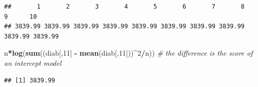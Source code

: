 \documentclass[
]{book}
\newenvironment{Shaded}{\begin{snugshade}}{\end{snugshade}}
\newcommand{\CommentTok}[1]{\textcolor[rgb]{0.56,0.35,0.01}{\textit{#1}}}
\newcommand{\DecValTok}[1]{\textcolor[rgb]{0.00,0.00,0.81}{#1}}
\newcommand{\KeywordTok}[1]{\textcolor[rgb]{0.13,0.29,0.53}{\textbf{#1}}}
\newcommand{\NormalTok}[1]{#1}
\newcommand{\OperatorTok}[1]{\textcolor[rgb]{0.81,0.36,0.00}{\textbf{#1}}}
\newcommand{\StringTok}[1]{\textcolor[rgb]{0.31,0.60,0.02}{#1}}
\begin{document}
\begin{Shaded}
\end{Shaded}

\begin{verbatim}
##       1       2       3       4       5       6       7       8       9      10 
## 3839.99 3839.99 3839.99 3839.99 3839.99 3839.99 3839.99 3839.99 3839.99 3839.99
\end{verbatim}

\begin{Shaded}
\begin{Highlighting}[]
\NormalTok{    n}\OperatorTok{*}\KeywordTok{log}\NormalTok{(}\KeywordTok{sum}\NormalTok{((diab[,}\DecValTok{11}\NormalTok{] }\OperatorTok{-}\StringTok{ }\KeywordTok{mean}\NormalTok{(diab[,}\DecValTok{11}\NormalTok{]))}\OperatorTok{^}\DecValTok{2}\OperatorTok{/}\NormalTok{n)) }\CommentTok{# the difference is the score of an intercept model}
\end{Highlighting}
\end{Shaded}

\begin{verbatim}
## [1] 3839.99
\end{verbatim}
\end{document}
